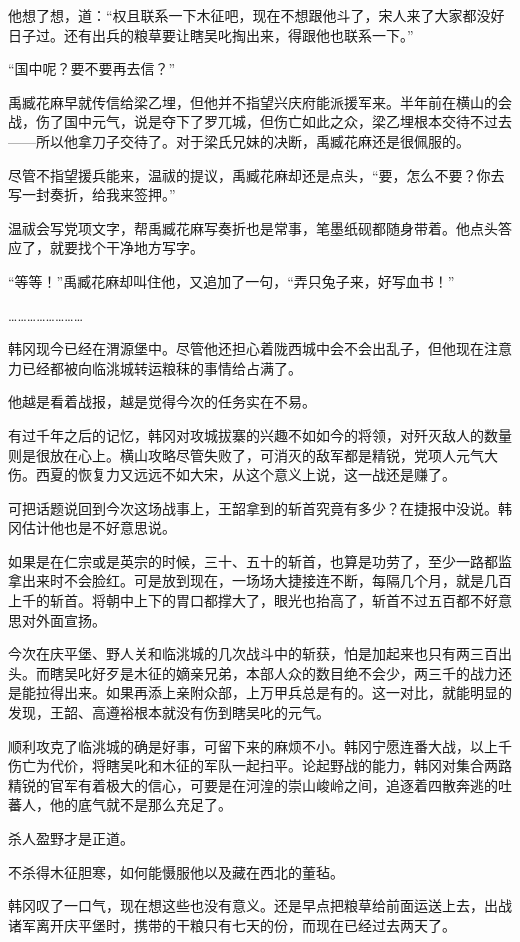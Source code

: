他想了想，道：“权且联系一下木征吧，现在不想跟他斗了，宋人来了大家都没好日子过。还有出兵的粮草要让瞎吴叱掏出来，得跟他也联系一下。”

“国中呢？要不要再去信？”

禹臧花麻早就传信给梁乙埋，但他并不指望兴庆府能派援军来。半年前在横山的会战，伤了国中元气，说是夺下了罗兀城，但伤亡如此之众，梁乙埋根本交待不过去——所以他拿刀子交待了。对于梁氏兄妹的决断，禹臧花麻还是很佩服的。

尽管不指望援兵能来，温祓的提议，禹臧花麻却还是点头，“要，怎么不要？你去写一封奏折，给我来签押。”

温祓会写党项文字，帮禹臧花麻写奏折也是常事，笔墨纸砚都随身带着。他点头答应了，就要找个干净地方写字。

“等等！”禹臧花麻却叫住他，又追加了一句，“弄只兔子来，好写血书！”

……………………

韩冈现今已经在渭源堡中。尽管他还担心着陇西城中会不会出乱子，但他现在注意力已经都被向临洮城转运粮秣的事情给占满了。

他越是看着战报，越是觉得今次的任务实在不易。

有过千年之后的记忆，韩冈对攻城拔寨的兴趣不如如今的将领，对歼灭敌人的数量则是很放在心上。横山攻略尽管失败了，可消灭的敌军都是精锐，党项人元气大伤。西夏的恢复力又远远不如大宋，从这个意义上说，这一战还是赚了。

可把话题说回到今次这场战事上，王韶拿到的斩首究竟有多少？在捷报中没说。韩冈估计他也是不好意思说。

如果是在仁宗或是英宗的时候，三十、五十的斩首，也算是功劳了，至少一路都监拿出来时不会脸红。可是放到现在，一场场大捷接连不断，每隔几个月，就是几百上千的斩首。将朝中上下的胃口都撑大了，眼光也抬高了，斩首不过五百都不好意思对外面宣扬。

今次在庆平堡、野人关和临洮城的几次战斗中的斩获，怕是加起来也只有两三百出头。而瞎吴叱好歹是木征的嫡亲兄弟，本部人众的数目绝不会少，两三千的战力还是能拉得出来。如果再添上亲附众部，上万甲兵总是有的。这一对比，就能明显的发现，王韶、高遵裕根本就没有伤到瞎吴叱的元气。

顺利攻克了临洮城的确是好事，可留下来的麻烦不小。韩冈宁愿连番大战，以上千伤亡为代价，将瞎吴叱和木征的军队一起扫平。论起野战的能力，韩冈对集合两路精锐的官军有着极大的信心，可要是在河湟的崇山峻岭之间，追逐着四散奔逃的吐蕃人，他的底气就不是那么充足了。

杀人盈野才是正道。

不杀得木征胆寒，如何能慑服他以及藏在西北的董毡。

韩冈叹了一口气，现在想这些也没有意义。还是早点把粮草给前面运送上去，出战诸军离开庆平堡时，携带的干粮只有七天的份，而现在已经过去两天了。

